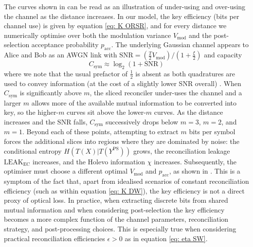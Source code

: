 ﻿\documentclass[12pt]{article}
\begin{document}
The curves shown in  can be read as an illustration of under-using and over-using the channel as the distance increases. In our model, the key efficiency (bits per channel use) is given by equation \eqref{eq: K ORSR}, and for every distance we numerically optimise over both the modulation variance $V_\text{mod}$ and the post-selection acceptance probability $p_\text{acc}$. The underlying Gaussian channel appears to Alice and Bob as an AWGN link with $\text{SNR} = (\frac{T}{2} V_\text{mod}) / (1+\frac{\xi}{2})$ and capacity
\begin{equation}
\label{eq: capacity}
C_\text{sym} \approx \log_2(1 + \text{SNR})
\end{equation}
where we note that the usual prefactor of $\tfrac{1}{2}$ is absent as both quadratures are used to convey information (at the cost of a slightly lower SNR overall) \cite{Laudenbach-2018}. When $C_\text{sym}$ is significantly above $m$, the sliced reconciler under-uses the channel and a larger $m$ allows more of the available mutual information to be converted into key, so the higher-$m$ curves sit above the lower-$m$ curves. As the distance increases and the $\text{SNR}$ falls, $C_\text{sym}$ successively drops below $m=3$, $m=2$, and $m=1$. Beyond each of these points, attempting to extract $m$ bits per symbol forces the additional slices into regions where they are dominated by noise: the conditional entropy $H(T(X)|T(Y^\text{PS}))$ grows, the reconciliation leakage $\text{LEAK}_\text{EC}$ increases, and the Holevo information $\chi$ increases. Subsequently, the optimiser must choose a different optimal $V_\text{mod}$ and $p_\text{acc}$, as shown in . This is a symptom of the fact that, apart from idealised scenarios of constant reconciliation efficiency (such as within equation \eqref{eq: K DW}), the key efficiency is not a direct proxy of optical loss. In practice, when extracting discrete bits from shared mutual information and when considering post-selection the key efficiency becomes a more complex function of the channel parameters, reconciliation strategy, and post-processing choices. This is especially true when considering practical reconciliation efficiencies $\epsilon > 0$ as in equation \eqref{eq: eta SW}.
\end{document}
